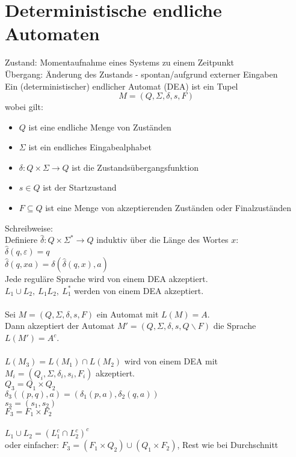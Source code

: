 \documentclass[a4paper]{article}
\let\epsilon\varepsilon
\begin{document}
\section{Deterministische endliche Automaten}
Zustand: Momentaufnahme eines Systems zu einem Zeitpunkt\\
Übergang: Änderung des Zustands - spontan/aufgrund externer Eingaben\\
Ein (deterministischer) endlicher Automat (DEA) ist ein Tupel $$M=\left(Q,\Sigma,\delta,s,F\right)$$
wobei gilt:
\begin{itemize}
\item $Q$ ist eine endliche Menge von Zuständen
\item $\Sigma$ ist ein endliches Eingabealphabet
\item $\delta:Q\times \Sigma \rightarrow Q$ ist die Zustandsübergangsfunktion
\item $s\in Q$ ist der Startzustand
\item $F\subseteq Q$ ist eine Menge von akzeptierenden Zuständen oder Finalzuständen
\end{itemize}
Schreibweise:\\
Definiere $\hat{\delta}:Q\times\Sigma^*\rightarrow Q$ induktiv über die Länge des Wortes $x$:\\
$\hat{\delta}(q,\epsilon)=q$\\
$\hat{\delta}(q,xa)=\delta(\hat{\delta}(q,x),a)$\\
Jede reguläre Sprache wird von einem DEA akzeptiert.\\
$L_1\cup L_2,\ L_1L_2,\ L_1^*$ werden von einem DEA akzeptiert.\\\\
Sei $M=\left(Q,\Sigma,\delta,s,F\right)$ ein Automat mit $L(M)=A$.\\
Dann akzeptiert der Automat $M'=\left(Q,\Sigma,\delta,s,Q\backslash F\right)$ die Sprache $L(M')=A^c$.\\\\
$L(M_3)=L(M_1)\cap L(M_2)$ wird von einem DEA mit $M_i=(Q_i,\Sigma,\delta_i,s_i,F_i)$ akzeptiert.\\
$Q_3=Q_1\times Q_2$\\
$\delta_3((p,q),a)=(\delta_1(p,a),\delta_2(q,a))$\\
$s_3=(s_1,s_2)$\\
$F_3=F_1\times F_2$\\\\
$L_1\cup L_2=(L_1^c\cap L_2^c)^c$\\
oder einfacher: $F_3=(F_1\times Q_2)\cup (Q_1\times F_2)$, Rest wie bei Durchschnitt
\end{document}
